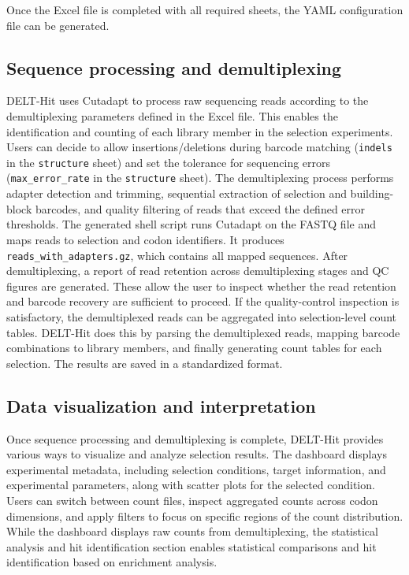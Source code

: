 Once the Excel file is completed with all required sheets, the YAML configuration file can be generated. 

\subsection{Sequence processing and demultiplexing}

DELT-Hit uses Cutadapt to process raw sequencing reads according to the demultiplexing parameters defined in the Excel file. This enables the identification and counting of each library member in the selection experiments. Users can decide to allow insertions/deletions during barcode matching (\texttt{indels} in the \texttt{structure} sheet) and set the tolerance for sequencing errors (\texttt{max\_error\_rate} in the \texttt{structure} sheet). The demultiplexing process performs adapter detection and trimming, sequential extraction of selection and building-block barcodes, and quality filtering of reads that exceed the defined error thresholds. The generated shell script runs Cutadapt on the FASTQ file and maps reads to selection and codon identifiers. It produces \texttt{reads\_with\_adapters.gz}, which contains all mapped sequences. After demultiplexing, a report of read retention across demultiplexing stages and QC figures are generated. These allow the user to inspect whether the read retention and barcode recovery are sufficient to proceed. If the quality-control inspection is satisfactory, the demultiplexed reads can be aggregated into selection-level count tables. DELT-Hit does this by parsing the demultiplexed reads, mapping barcode combinations to library members, and finally generating count tables for each selection. The results are saved in a standardized format. 

\subsection{Data visualization and interpretation}

Once sequence processing and demultiplexing is complete, DELT-Hit provides various ways to visualize and analyze selection results. The dashboard displays experimental metadata, including selection conditions, target information, and experimental parameters, along with scatter plots for the selected condition. Users can switch between count files, inspect aggregated counts across codon dimensions, and apply filters to focus on specific regions of the count distribution. While the dashboard displays raw counts from demultiplexing, the statistical analysis and hit identification section enables statistical comparisons and hit identification based on enrichment analysis. 


